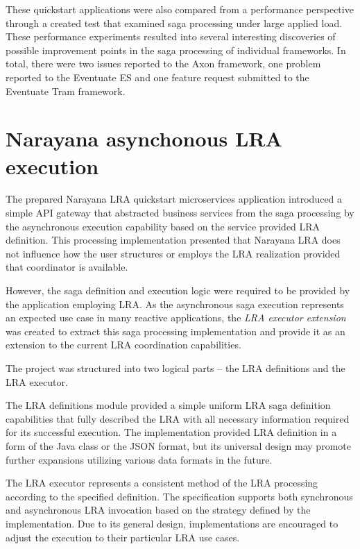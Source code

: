 \documentclass[oneside,
  digital, %
  table,   %
  lof,     %
  lot,     %
]{fithesis3}
\begin{document}
These quickstart applications were also compared from a performance perspective through a created test that examined saga processing under large applied load. These performance experiments resulted into several interesting discoveries of possible improvement points in the saga processing of individual frameworks. In total, there were two issues reported to the Axon framework, one problem reported to the Eventuate ES and one feature request submitted to the Eventuate Tram framework.

\section{Narayana asynchonous LRA execution}

The prepared Narayana LRA quickstart microservices application introduced a simple API gateway that abstracted business services from the saga processing by the asynchronous execution capability based on the service provided LRA definition. This processing implementation presented that Narayana LRA does not influence how the user structures or employs the LRA realization provided that coordinator is available.

However, the saga definition and execution logic were required to be provided by the application employing LRA. As the asynchronous saga execution represents an expected use case in many reactive applications, the \textit{LRA executor extension} was created to extract this saga processing implementation and provide it as an extension to the current LRA coordination capabilities.

The project was structured into two logical parts -- the LRA definitions and the LRA executor.

The LRA definitions module provided a simple uniform LRA saga definition capabilities that fully described the LRA with all necessary information required for its successful execution. The implementation provided LRA definition in a form of the Java class or the JSON format, but its universal design may promote further expansions utilizing various data formats in the future. 

The LRA executor represents a consistent method of the LRA processing according to the specified definition. The specification supports both synchronous and asynchronous LRA invocation based on the strategy defined by the implementation. Due to its general design, implementations are encouraged to adjust the execution to their particular LRA use cases.
\end{document}
